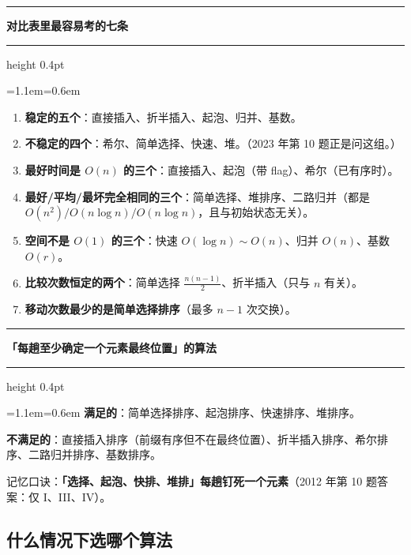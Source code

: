 \documentclass[11pt,openany,UTF8]{ctexbook}
\newcommand{\callouthead}[2]{%
  \par\addvspace{7pt}\noindent
  {\color{#1}\rule[-0.15em]{3pt}{1.05em}}\hspace{0.5em}%
  {\bfseries\color{#1}#2}\par\nobreak\vspace{-0.35em}%
  {\color{rulesep}\hrule height 0.4pt}\nobreak\vspace{0.45em}%
  \begingroup\small\setlength{\parindent}{0pt}%
  \leftskip=1.1em\rightskip=0.6em\noindent\ignorespaces}
\newcommand{\calloutend}{\par\endgroup\addvspace{7pt}}
\newenvironment{callkey}[1]{\callouthead{keybar}{#1}}{\calloutend}
\begin{document}
\begin{callkey}{对比表里最容易考的七条}
\begin{enumerate}
\item \textbf{稳定的五个}：直接插入、折半插入、起泡、归并、基数。
\item \textbf{不稳定的四个}：希尔、简单选择、快速、堆。（2023 年第 10 题正是问这组。）
\item \textbf{最好时间是 $O(n)$ 的三个}：直接插入、起泡（带 flag）、希尔（已有序时）。
\item \textbf{最好/平均/最坏完全相同的三个}：简单选择、堆排序、二路归并（都是 $O(n^2)/O(n\log n)/O(n\log n)$，且与初始状态无关）。
\item \textbf{空间不是 $O(1)$ 的三个}：快速 $O(\log n)\sim O(n)$、归并 $O(n)$、基数 $O(r)$。
\item \textbf{比较次数恒定的两个}：简单选择 $\frac{n(n-1)}{2}$、折半插入（只与 $n$ 有关）。
\item \textbf{移动次数最少的是简单选择排序}（最多 $n-1$ 次交换）。
\end{enumerate}
\end{callkey}

\begin{callkey}{「每趟至少确定一个元素最终位置」的算法}
\textbf{满足的}：简单选择排序、起泡排序、快速排序、堆排序。

\textbf{不满足的}：直接插入排序（前缀有序但不在最终位置）、折半插入排序、希尔排序、二路归并排序、基数排序。

记忆口诀：\textbf{「选择、起泡、快排、堆排」每趟钉死一个元素}（2012 年第 10 题答案：仅 I、III、IV）。

\end{callkey}

\subsection{什么情况下选哪个算法}
\end{document}
